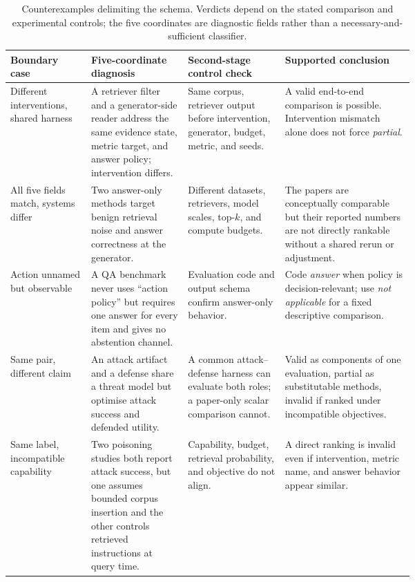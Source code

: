 \begin{table}[t]
\centering
\scriptsize
\renewcommand{\arraystretch}{0.9}
\begin{tabularx}{\linewidth}{>{\raggedright\arraybackslash}p{0.20\linewidth}>{\raggedright\arraybackslash}p{0.24\linewidth}>{\raggedright\arraybackslash}p{0.24\linewidth}X}
\toprule
\textbf{Boundary case} & \textbf{Five-coordinate diagnosis} & \textbf{Second-stage control check} & \textbf{Supported conclusion} \\
\midrule
Different interventions, shared harness & A retriever filter and a generator-side reader address the same evidence state, metric target, and answer policy; intervention differs. & Same corpus, retriever output before intervention, generator, budget, metric, and seeds. & A valid end-to-end comparison is possible. Intervention mismatch alone does not force \emph{partial}. \\
All five fields match, systems differ & Two answer-only methods target benign retrieval noise and answer correctness at the generator. & Different datasets, retrievers, model scales, top-$k$, and compute budgets. & The papers are conceptually comparable but their reported numbers are not directly rankable without a shared rerun or adjustment. \\
Action unnamed but observable & A QA benchmark never uses ``action policy'' but requires one answer for every item and gives no abstention channel. & Evaluation code and output schema confirm answer-only behavior. & Code \emph{answer} when policy is decision-relevant; use \emph{not applicable} for a fixed descriptive comparison. \\
Same pair, different claim & An attack artifact and a defense share a threat model but optimise attack success and defended utility. & A common attack--defense harness can evaluate both roles; a paper-only scalar comparison cannot. & Valid as components of one evaluation, partial as substitutable methods, invalid if ranked under incompatible objectives. \\
Same label, incompatible capability & Two poisoning studies both report attack success, but one assumes bounded corpus insertion and the other controls retrieved instructions at query time. & Capability, budget, retrieval probability, and objective do not align. & A direct ranking is invalid even if intervention, metric name, and answer behavior appear similar. \\
\bottomrule
\end{tabularx}
\caption{Counterexamples delimiting the schema. Verdicts depend on the stated comparison and experimental controls; the five coordinates are diagnostic fields rather than a necessary-and-sufficient classifier.}
\label{tab:framework-counterexamples}
\end{table}
